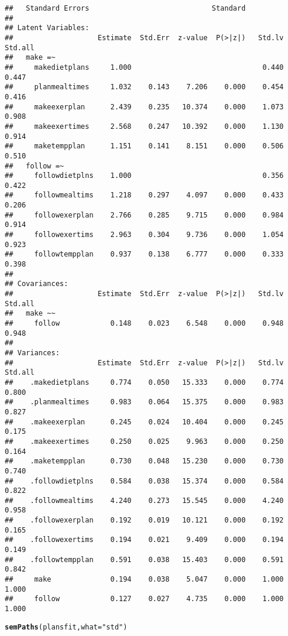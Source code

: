 \documentclass{article}\usepackage[]{graphicx}\usepackage[]{color}
\makeatletter
\newcommand{\hlstr}[1]{\textcolor[rgb]{0.192,0.494,0.8}{#1}}%
\newcommand{\hlstd}[1]{\textcolor[rgb]{0.345,0.345,0.345}{#1}}%
\newcommand{\hlkwc}[1]{\textcolor[rgb]{0.333,0.667,0.333}{#1}}%
\newcommand{\hlkwd}[1]{\textcolor[rgb]{0.737,0.353,0.396}{\textbf{#1}}}%
\newenvironment{kframe}{%
 \def\at@end@of@kframe{}%
 \ifinner\ifhmode%
  \def\at@end@of@kframe{\end{minipage}}%
  \begin{minipage}{\columnwidth}%
 \fi\fi%
 \def\FrameCommand##1{\hskip\@totalleftmargin \hskip-\fboxsep
 \colorbox{shadecolor}{##1}\hskip-\fboxsep
     \hskip-\linewidth \hskip-\@totalleftmargin \hskip\columnwidth}%
 \MakeFramed {\advance\hsize-\width
   \@totalleftmargin\z@ \linewidth\hsize
   \@setminipage}}%
 {\par\unskip\endMakeFramed%
 \at@end@of@kframe}
\newenvironment{knitrout}{}{} %
\makeatother
\begin{document}
\begin{knitrout}
\begin{kframe}
\begin{verbatim}
##   Standard Errors                             Standard
## 
## Latent Variables:
##                    Estimate  Std.Err  z-value  P(>|z|)   Std.lv  Std.all
##   make =~                                                               
##     makedietplans     1.000                               0.440    0.447
##     planmealtimes     1.032    0.143    7.206    0.000    0.454    0.416
##     makeexerplan      2.439    0.235   10.374    0.000    1.073    0.908
##     makeexertimes     2.568    0.247   10.392    0.000    1.130    0.914
##     maketempplan      1.151    0.141    8.151    0.000    0.506    0.510
##   follow =~                                                             
##     followdietplns    1.000                               0.356    0.422
##     followmealtims    1.218    0.297    4.097    0.000    0.433    0.206
##     followexerplan    2.766    0.285    9.715    0.000    0.984    0.914
##     followexertims    2.963    0.304    9.736    0.000    1.054    0.923
##     followtempplan    0.937    0.138    6.777    0.000    0.333    0.398
## 
## Covariances:
##                    Estimate  Std.Err  z-value  P(>|z|)   Std.lv  Std.all
##   make ~~                                                               
##     follow            0.148    0.023    6.548    0.000    0.948    0.948
## 
## Variances:
##                    Estimate  Std.Err  z-value  P(>|z|)   Std.lv  Std.all
##    .makedietplans     0.774    0.050   15.333    0.000    0.774    0.800
##    .planmealtimes     0.983    0.064   15.375    0.000    0.983    0.827
##    .makeexerplan      0.245    0.024   10.404    0.000    0.245    0.175
##    .makeexertimes     0.250    0.025    9.963    0.000    0.250    0.164
##    .maketempplan      0.730    0.048   15.230    0.000    0.730    0.740
##    .followdietplns    0.584    0.038   15.374    0.000    0.584    0.822
##    .followmealtims    4.240    0.273   15.545    0.000    4.240    0.958
##    .followexerplan    0.192    0.019   10.121    0.000    0.192    0.165
##    .followexertims    0.194    0.021    9.409    0.000    0.194    0.149
##    .followtempplan    0.591    0.038   15.403    0.000    0.591    0.842
##     make              0.194    0.038    5.047    0.000    1.000    1.000
##     follow            0.127    0.027    4.735    0.000    1.000    1.000
\end{verbatim}
\begin{alltt}
\hlkwd{semPaths}\hlstd{(plansfit,} \hlkwc{what} \hlstd{=} \hlstr{"std"}\hlstd{)}
\end{alltt}
\end{kframe}

\end{knitrout}
\end{document}
